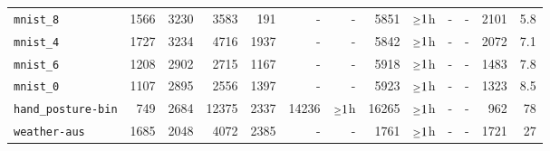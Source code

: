 \begin{tabular}{lrrrrrrrrrrrr}
\texttt{mnist\_8} & 1566 & 3230 & 3583 & 191 & - & - & 5851 & $\mathsmaller{\geq}1$h & - & - & 2101 & 5.8\\
\texttt{mnist\_4} & 1727 & 3234 & 4716 & 1937 & - & - & 5842 & $\mathsmaller{\geq}1$h & - & - & 2072 & 7.1\\
\texttt{mnist\_6} & 1208 & 2902 & 2715 & 1167 & - & - & 5918 & $\mathsmaller{\geq}1$h & - & - & 1483 & 7.8\\
\texttt{mnist\_0} & 1107 & 2895 & 2556 & 1397 & - & - & 5923 & $\mathsmaller{\geq}1$h & - & - & 1323 & 8.5\\
\texttt{hand\_posture-bin} & 749 & 2684 & 12375 & 2337 & 14236 & $\mathsmaller{\geq}1$h & 16265 & $\mathsmaller{\geq}1$h & - & - & 962 & 78\\
\texttt{weather-aus} & 1685 & 2048 & 4072 & 2385 & - & - & 1761 & $\mathsmaller{\geq}1$h & - & - & 1721 & 27\\
\bottomrule
\end{tabular}
